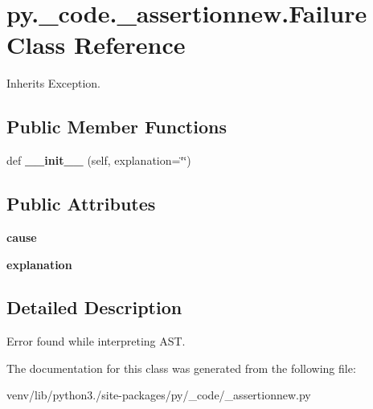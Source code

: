 \hypertarget{classpy_1_1__code_1_1__assertionnew_1_1_failure}{}\section{py.\+\_\+code.\+\_\+assertionnew.\+Failure Class Reference}
\label{classpy_1_1__code_1_1__assertionnew_1_1_failure}


Inherits Exception.

\subsection*{Public Member Functions}
\begin{DoxyCompactItemize}
\item 
\mbox{\label{classpy_1_1__code_1_1__assertionnew_1_1_failure_ad87da4e9ffb8cc14581d53393c28e912}} 
def {\bfseries \+\_\+\+\_\+init\+\_\+\+\_\+} (self, explanation=\char`\"{}\char`\"{})
\end{DoxyCompactItemize}
\subsection*{Public Attributes}
\begin{DoxyCompactItemize}
\item 
\mbox{\label{classpy_1_1__code_1_1__assertionnew_1_1_failure_a5a7d2bb6eb3f474273718738d6819470}} 
{\bfseries cause}
\item 
\mbox{\label{classpy_1_1__code_1_1__assertionnew_1_1_failure_a836fcd6b8a80dcb322b1306c6ed7a239}} 
{\bfseries explanation}
\end{DoxyCompactItemize}


\subsection{Detailed Description}
\begin{DoxyVerb}Error found while interpreting AST.\end{DoxyVerb}
 

The documentation for this class was generated from the following file\+:\begin{DoxyCompactItemize}
\item 
venv/lib/python3./site-\/packages/py/\+\_\+code/\+\_\+assertionnew.\+py\end{DoxyCompactItemize}
